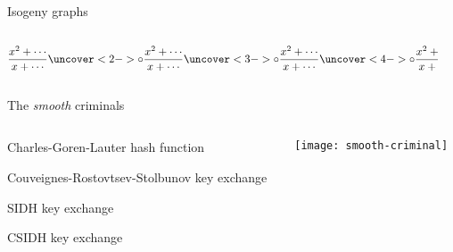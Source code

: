 \documentclass[aspectratio=169]{beamer}
\begin{document}
\begin{frame}{Isogeny graphs}
  \large
  \begin{columns}
    \begin{column}{0.45\textwidth}
      \[
        \frac{x^2 + \cdots}{x + \cdots}
        \uncover<2->{\circ\frac{x^2 + \cdots}{x + \cdots}}
        \uncover<3->{\circ\frac{x^2 + \cdots}{x + \cdots}}
        \uncover<4->{\circ\frac{x^2 + \cdots}{x + \cdots}}
      \]
    \end{column}
    \begin{column}{0.55\textwidth}
      \centering
    \end{column}
  \end{columns}
\end{frame}


\begin{frame}
  \centering
\end{frame}


\begin{frame}{The \textit{smooth} criminals}
  \Large
  \begin{columns}
    \begin{column}{0.7\textwidth}
      \begin{description}
        \setlength{\itemsep}{1em}
      \item[2006] Charles-Goren-Lauter hash function
      \item[2006] Couveignes-Rostovtsev-Stolbunov key exchange
      \item[2011] SIDH key exchange
      \item[2018] CSIDH key exchange
      \end{description}
    \end{column}
    \begin{column}{0.3\textwidth}
      \texttt{[image: smooth-criminal]}
    \end{column}
  \end{columns}
\end{frame}
\end{document}
